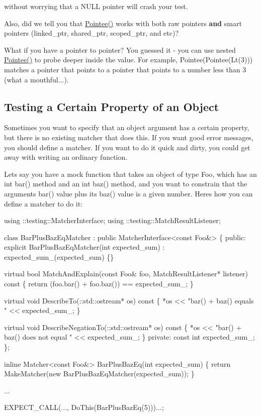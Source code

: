 without worrying that a {\ttfamily N\+U\+LL} pointer will crash your test.

Also, did we tell you that {\ttfamily \hyperlink{namespacetesting_a5122ca3533f3a00f67e146dd81f3b68c}{Pointee()}} works with both raw pointers {\bfseries and} smart pointers ({\ttfamily linked\+\_\+ptr}, {\ttfamily shared\+\_\+ptr}, {\ttfamily scoped\+\_\+ptr}, and etc)?

What if you have a pointer to pointer? You guessed it -\/ you can use nested {\ttfamily \hyperlink{namespacetesting_a5122ca3533f3a00f67e146dd81f3b68c}{Pointee()}} to probe deeper inside the value. For example, {\ttfamily Pointee(Pointee(\+Lt(3)))} matches a pointer that points to a pointer that points to a number less than 3 (what a mouthful...).

\subsection*{Testing a Certain Property of an Object}

Sometimes you want to specify that an object argument has a certain property, but there is no existing matcher that does this. If you want good error messages, you should define a matcher. If you want to do it quick and dirty, you could get away with writing an ordinary function.

Let\textquotesingle{}s say you have a mock function that takes an object of type {\ttfamily Foo}, which has an {\ttfamily int bar()} method and an {\ttfamily int baz()} method, and you want to constrain that the argument\textquotesingle{}s {\ttfamily bar()} value plus its {\ttfamily baz()} value is a given number. Here\textquotesingle{}s how you can define a matcher to do it\+:


\begin{DoxyCode}
using ::testing::MatcherInterface;
using ::testing::MatchResultListener;

class BarPlusBazEqMatcher : public MatcherInterface<const Foo&> \{
 public:
  explicit BarPlusBazEqMatcher(int expected\_sum)
      : expected\_sum\_(expected\_sum) \{\}

  virtual bool MatchAndExplain(const Foo& foo,
                               MatchResultListener* listener) const \{
    return (foo.bar() + foo.baz()) == expected\_sum\_;
  \}

  virtual void DescribeTo(::std::ostream* os) const \{
    *os << "bar() + baz() equals " << expected\_sum\_;
  \}

  virtual void DescribeNegationTo(::std::ostream* os) const \{
    *os << "bar() + baz() does not equal " << expected\_sum\_;
  \}
 private:
  const int expected\_sum\_;
\};

inline Matcher<const Foo&> BarPlusBazEq(int expected\_sum) \{
  return MakeMatcher(new BarPlusBazEqMatcher(expected\_sum));
\}

...

  EXPECT\_CALL(..., DoThis(BarPlusBazEq(5)))...;
\end{DoxyCode}


